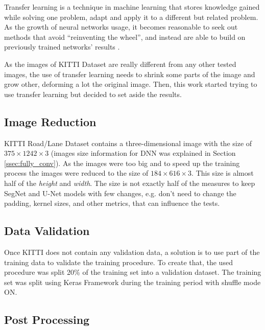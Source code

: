\documentclass[10pt,twocolumn,letterpaper]{article}
\begin{document}
Transfer learning is a technique in machine learning that stores knowledge gained while solving one problem, adapt and apply it to a different but related problem. As the growth of neural networks usage, it becomes reasonable to seek out methods that avoid ``reinventing the wheel'', and instead are able to build on previously trained networks' results \cite{PRATT} \cite{WEISS2016}.

As the images of KITTI Dataset are really different from any other tested images, the use of transfer learning needs to shrink some parts of the image and grow other, deforming a lot the original image. Then, this work started trying to use transfer learning but decided to set aside the results.

\subsection{Image Reduction} \label{ssec:image_reduction}

KITTI Road/Lane Dataset contains a three-dimensional image with the size of $375 \times 1242 \times 3$ (images size information for DNN was explained in Section \ref{ssec:fully_conv}). As the images were too big and to speed up the training process the images were reduced to the size of $ 184 \times 616 \times 3$. This size is almost half of the \textit{height} and \textit{width}. The size is not exactly half of the measures to keep SegNet and U-Net models with few changes, e.g. don't need to change the padding, kernel sizes, and other metrics, that can influence the tests.

\subsection{Data Validation} \label{ssec:data_validation}

Once KITTI does not contain any validation data, a solution is to use part of the training data to validate the training procedure. To create that, the used procedure was split 20\% of the training set into a validation dataset. The training set was split using Keras Framework during the training period with shuffle mode ON.

\subsection{Post Processing} \label{ssec:post_processing}
\end{document}
